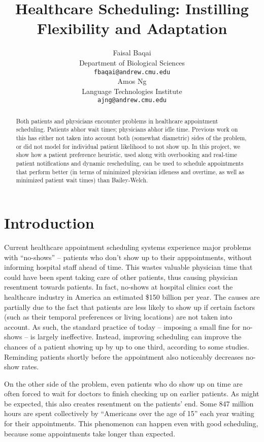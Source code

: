 \documentclass{article} %
\title{Healthcare Scheduling: Instilling Flexibility and Adaptation}
\author{
Faisal Baqai\\
Department of Biological Sciences\\
\texttt{fbaqai@andrew.cmu.edu} \\
\And
Amos Ng \\
Language Technologies Institute \\
\texttt{ajng@andrew.cmu.edu} \\
}
\begin{document}
\maketitle

\begin{abstract}
Both patients and physicians encounter problems in healthcare appointment scheduling. Patients abhor wait times; physicians abhor idle time. Previous work on this has either not taken into account both (somewhat diametric) sides of the problem, or did not model for individual patient likelihood to not show up. In this project, we show how a patient preference heuristic, used along with overbooking and real-time patient notifications and dynamic rescheduling, can be used to schedule appointments that perform better (in terms of minimized physician idleness and overtime, as well as minimized patient wait times) than Bailey-Welch.
\end{abstract}

\section{Introduction}

Current healthcare appointment scheduling systems experience major problems with ``no-shows'' -- patients who don't show up to their apppointments, without informing hospital staff ahead of time. This wastes valuable physician time that could have been spent taking care of other patients, thus causing physician resentment towards patients. In fact, no-shows at hospital clinics cost the healthcare industry in America an estimated \$150 billion per year. The causes are partially due to the fact that patients are less likely to show up if certain factors (such as their temporal preferences or living locations) are not taken into account. As such, the standard practice of today -- imposing a small fine for no-shows -- is largely ineffective. Instead, improving scheduling can improve the chances of a patient showing up by up to one third, according to some studies. Reminding patients shortly before the appointment also noticeably decreases no-show rates.\cite{toland2013}

On the other side of the problem, even patients who do show up on time are often forced to wait for doctors to finish checking up on earlier patients. As might be expected, this also creates resentment on the patients' end. Some 847 million hours are spent collectively by ``Americans over the age of 15'' each year waiting for their appointments.\cite{krueger2009} This phenomenon can happen even with good scheduling, because some appointments take longer than expected.
\end{document}
